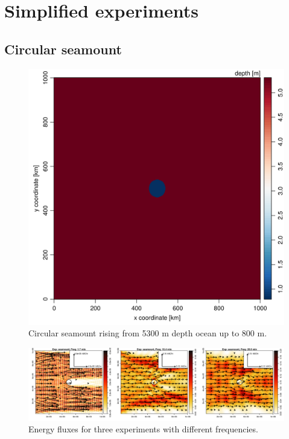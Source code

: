 \section{Simplified experiments}
\subsection{Circular seamount}
\begin{figure}
\centering
\includegraphics[scale=0.5]{../figures/test_seamount_bathy.png}
\caption{Circular seamount rising from 5300 m depth ocean up to 800 m.}
\end{figure}

\begin{figure}
\centering
\includegraphics[scale=0.5]{../figures/fluxes_circ_sm.png}
\caption{Energy fluxes for three experiments with different frequencies.}
\end{figure}

